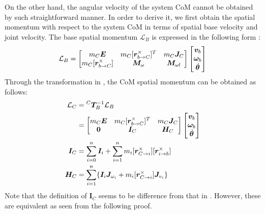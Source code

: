 On the other hand,
the angular velocity of the system CoM cannot be obtained by such straightforward manner.
In order to derive it, we first obtain the spatial momentum with respect to the system CoM
in terms of spatial base velocity and joint velocity.
The base spatial momentum $\mathcal{L}_{B}$ is expressed in the following form \cite{Masutani}:
%
\begin{align}
  \mathcal{L}_{B} =
  \begin{bmatrix}
    m_{C}\bm{E} & m_{C}[\bm{r}_{b \rightarrow C}^{\times}]^{T} & m_{C}\bm{J}_{C}\\
    m_{C}[\bm{r}_{b \rightarrow C}^{\times}] & \bm{M}_{\omega} & \bm{M}_{\omega l}
  \end{bmatrix}
  {\begin{bmatrix} \bm{v}_{b} \\ \bm{\omega}_{b} \\ {\dot{\bm{\theta}}}\end{bmatrix}}
\end{align}
%
Through the transformation in ,
the CoM spatial momentum can be obtained as follows:
%
\begin{align}
  \mathcal{L}_{C} &= {}^{C}\bm{T}_{B}^{-1}\mathcal{L}_{B}\label{eq:APP_LC2}\\
  &=
  \begin{bmatrix}
    m_{C}\bm{E} & m_{C}[\bm{r}_{b \rightarrow C}^{\times}]^{T} & m_{C}\bm{J}_{C}\\
    \bm{0} & \bm{I}_{C} & \bm{H}_{C}
  \end{bmatrix}
  {\begin{bmatrix} \bm{v}_{b} \\ \bm{\omega}_{b} \\ {\dot{\bm{\theta}}}\end{bmatrix}}\notag\\
  \bm{I}_{C} &= \sum_{i=0}^{n}\bm{I}_{i} + \sum_{i=1}^{n}m_{i}[\bm{r}_{C \rightarrow i}^{\times}][\bm{r}_{i \rightarrow b}^{\times}]\label{eq:APP_IC}\\
  \bm{H}_{C} &= \sum_{i=1}^{n}\{\bm{I}_{i}\bm{J}_{\omega_{i}} + m_{i}[\bm{r}_{C \rightarrow i}^{\times}]\bm{J}_{v_{i}}\}
\end{align}
%
Note that the definition of $\bm{I}_{C}$ seems to be difference from that in .
However, these are equivalent as seen from the following proof.

